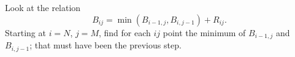 Look at the relation
\[ B_{ij} = \min(B_{i-1,j},B_{i,j-1})+R_{ij}. \]
Starting at $i=N$, $j=M$, find for each $ij$ point the minimum of
$B_{i-1,j}$ and~$B_{i,j-1}$; that must have been the previous step.
